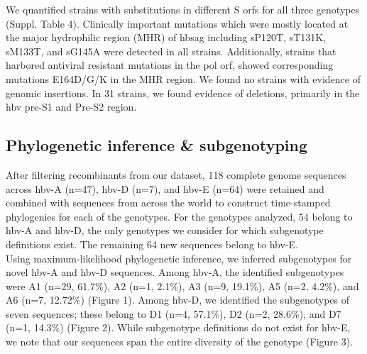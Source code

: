 We quantified strains with substitutions in different S \gls{orf}s for all three genotypes (Suppl. Table 4). Clinically important mutations which were mostly located at the major hydrophilic region (MHR) of \gls{hbsag} including sP120T, sT131K, sM133T, and sG145A were detected in all strains. Additionally, strains that harbored antiviral resistant mutations in the pol \gls{orf}, showed corresponding mutations E164D/G/K in the MHR region. We found no strains with evidence of genomic insertions. In 31 strains, we found evidence of deletions, primarily in the \gls{hbv} pre-S1 and Pre-S2 region.

\subsection{Phylogenetic inference \& subgenotyping}
After filtering recombinants from our dataset, 118 complete genome sequences across \gls{hbv}-A (n=47), \gls{hbv}-D (n=7), and \gls{hbv}-E (n=64) were retained and combined with sequences from across the world to construct time-stamped phylogenies for each of the genotypes. For the genotypes analyzed, 54 belong to \gls{hbv}-A and \gls{hbv}-D, the only genotypes we consider for which subgenotype definitions exist. The remaining 64 new sequences belong to \gls{hbv}-E.\\

Using maximum-likelihood phylogenetic inference, we inferred subgenotypes for novel \gls{hbv}-A and \gls{hbv}-D sequences. Among \gls{hbv}-A, the identified subgenotypes were A1 (n=29, 61.7\%), A2 (n=1, 2.1\%), A3 (n=9, 19.1\%), A5 (n=2,  4.2\%), and A6 (n=7, 12.72\%) (Figure 1). Among \gls{hbv}-D, we identified the subgenotypes of seven sequences; these belong to D1 (n=4, 57.1\%), D2 (n=2, 28.6\%), and D7 (n=1, 14.3\%) (Figure 2). While subgenotype definitions do not exist for \gls{hbv}-E, we note that our sequences span the entire diversity of the genotype (Figure 3). 




